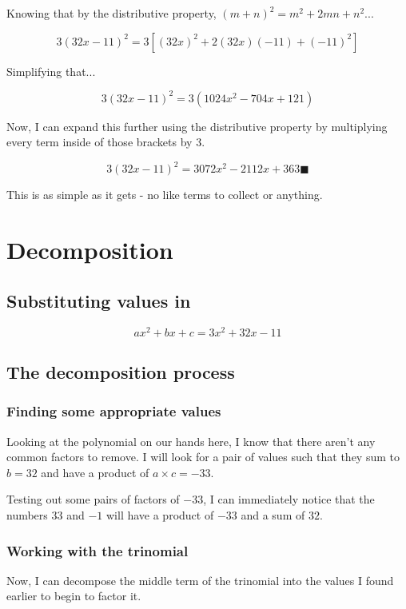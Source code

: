 \documentclass[12pt]{article}
\begin{document}
Knowing that by the distributive property, $(m+n)^2 = m^2 + 2mn + n^2$...

\[
3(32x-11)^2 = 3[(32x)^2 + 2(32x)(-11) + (-11)^2]
\]

Simplifying that...

\[
3(32x-11)^2 = 3(1024x^2 -704x + 121)
\]

Now, I can expand this further using the distributive property by multiplying every term inside of those brackets by $3$.

\[
3(32x-11)^2 = 3072x^2 -2112x + 363 \blacksquare
\]

This is as simple as it gets - no like terms to collect or anything.

\newpage

\section{Decomposition}

\subsection{Substituting values in}

\[
ax^2 + bx + c = 3x^2 + 32x - 11
\]

\subsection{The decomposition process}

\subsubsection{Finding some appropriate values}

Looking at the polynomial on our hands here, I know that there aren't any common factors to remove.
I will look for a pair of values such that they sum to $b=32$ and have a product of $a\times c = -33$.

Testing out some pairs of factors of $-33$, I can immediately notice that the numbers $33$ and $-1$ will have a product of $-33$ and a sum of $32$.

\subsubsection{Working with the trinomial}

Now, I can decompose the middle term of the trinomial into the values I found earlier to begin to factor it.
\end{document}
